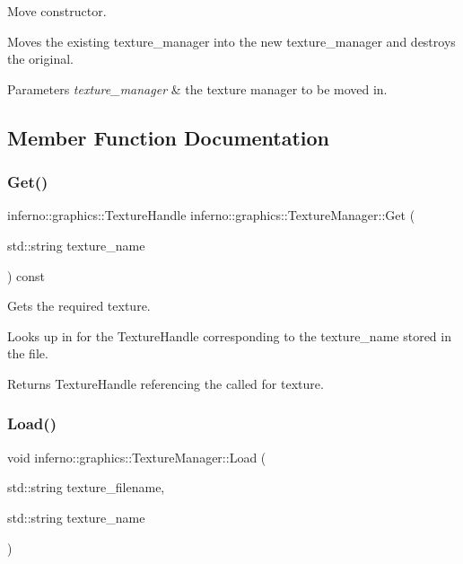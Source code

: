 Move constructor. 

Moves the existing texture\+\_\+manager into the new texture\+\_\+manager and destroys the original. 
\begin{DoxyParams}{Parameters}
{\em texture\+\_\+manager} & the texture manager to be moved in. \\
\hline
\end{DoxyParams}


\subsection{Member Function Documentation}
\mbox{\label{classinferno_1_1graphics_1_1_texture_manager_ae2b18c9725addce31e35034ea6642fbf}} 
\subsubsection{\texorpdfstring{Get()}{Get()}}
{\footnotesize\ttfamily inferno\+::graphics\+::\+Texture\+Handle inferno\+::graphics\+::\+Texture\+Manager\+::\+Get (\begin{DoxyParamCaption}\item[{std\+::string}]{texture\+\_\+name }\end{DoxyParamCaption}) const}



Gets the required texture. 

Looks up in for the Texture\+Handle corresponding to the texture\+\_\+name stored in the file. \begin{DoxyReturn}{Returns}
Texture\+Handle referencing the called for texture. 
\end{DoxyReturn}
\mbox{\label{classinferno_1_1graphics_1_1_texture_manager_aa8a3d242633cc83fd3fe178520d15cb6}} 
\subsubsection{\texorpdfstring{Load()}{Load()}}
{\footnotesize\ttfamily void inferno\+::graphics\+::\+Texture\+Manager\+::\+Load (\begin{DoxyParamCaption}\item[{std\+::string}]{texture\+\_\+filename,  }\item[{std\+::string}]{texture\+\_\+name }\end{DoxyParamCaption})}



